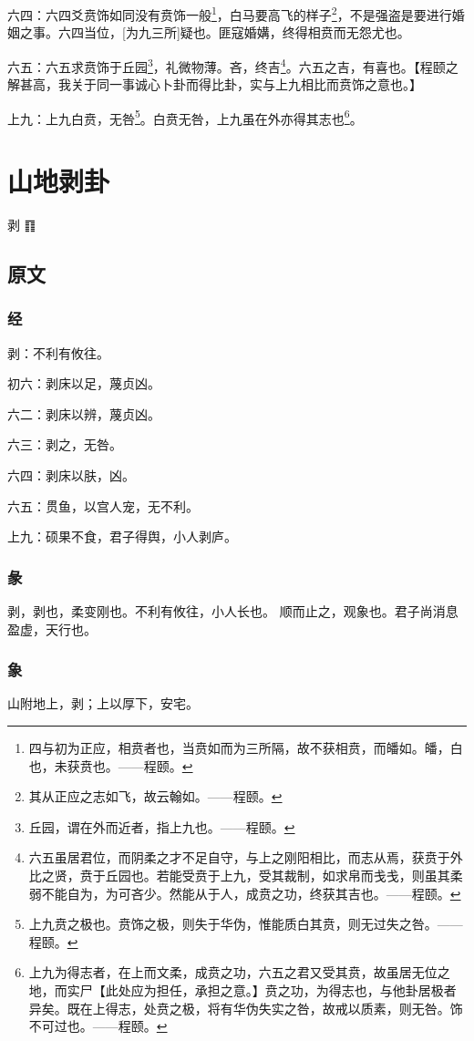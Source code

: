 \documentclass[12pt,oneside]{book}
\begin{document}
六四：六四爻贲饰如同没有贲饰一般\footnote{四与初为正应，相贲者也，当贲如而为三所隔，故不获相贲，而皤如。皤，白也，未获贲也。——程颐。}，白马要高飞的样子\footnote{其从正应之志如飞，故云翰如。——程颐。}，不是强盗是要进行婚姻之事。六四当位，[为九三所]疑也。匪寇婚媾，终得相贲而无怨尤也。

六五：六五求贲饰于丘园\footnote{丘园，谓在外而近者，指上九也。——程颐。}，礼微物薄。吝，终吉\footnote{六五虽居君位，而阴柔之才不足自守，与上之刚阳相比，而志从焉，获贲于外比之贤，贲于丘园也。若能受贲于上九，受其裁制，如求帛而戋戋，则虽其柔弱不能自为，为可吝少。然能从于人，成贲之功，终获其吉也。——程颐。}。六五之吉，有喜也。【程颐之解甚高，我关于同一事诚心卜卦而得比卦，实与上九相比而贲饰之意也。】

上九：上九白贲，无咎\footnote{上九贲之极也。贲饰之极，则失于华伪，惟能质白其贲，则无过失之咎。——程颐。}。白贲无咎，上九虽在外亦得其志也\footnote{上九为得志者，在上而文柔，成贲之功，六五之君又受其贲，故虽居无位之地，而实尸【此处应为担任，承担之意。】贲之功，为得志也，与他卦居极者异矣。既在上得志，处贲之极，将有华伪失实之咎，故戒以质素，则无咎。饰不可过也。——程颐。}。



\chapter{山地剥卦}
剥 {\Large ䷖}

\section{原文}
\subsection{经}
剥：不利有攸往。

初六：剥床以足，蔑贞凶。

六二：剥床以辨，蔑贞凶。

六三：剥之，无咎。

六四：剥床以肤，凶。

六五：贯鱼，以宫人宠，无不利。

上九：硕果不食，君子得舆，小人剥庐。

\subsection{彖}
剥，剥也，柔变刚也。不利有攸往，小人长也。 顺而止之，观象也。君子尚消息盈虚，天行也。
\subsection{象}
山附地上，剥；上以厚下，安宅。
\end{document}
